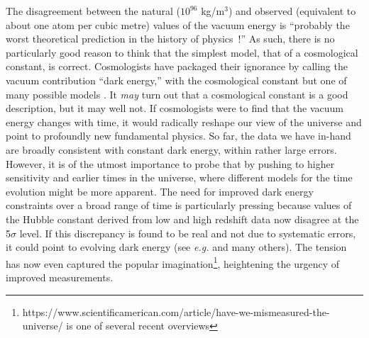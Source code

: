 \documentclass[letterpaper,11pt,preprint]{aastex}
\begin{document}
The disagreement between the natural ($10^{96}$ kg/m$^3$) and observed
(equivalent to about one atom per cubic metre) values of the vacuum
energy is ``probably the worst theoretical prediction in the history
of physics~\citep{Hobson06}!''  As such, there is no particularly good
reason to think that the simplest model, that of a cosmological
constant, is correct.  Cosmologists have packaged their ignorance by
calling the vacuum contribution ``dark energy,'' with the cosmological
constant but one of many possible models \citep{Ratra88,Steinhardt99}.
It {\textit{may}} turn out that a cosmological constant is a good
description, but it may well not.  If cosmologists were to find that
the vacuum energy changes with time, it would radically reshape our
view of the universe and point to profoundly new fundamental physics.
So far, the data we have in-hand are broadly consistent with constant
dark energy, within rather large errors.  However, it is of the utmost
importance to probe that by pushing to higher sensitivity and earlier
times in the universe, where different models for the time evolution
might be more apparent.  The need for improved dark energy constraints
over a broad range of time is particularly pressing because
values of the Hubble constant derived from low and high redshift data
now disagree at the 5$\sigma$ level.  If this discrepancy is found to
be real and not due to systematic errors, it could point to evolving
dark energy (see {\it{e.g.}} \citet{Freedman2017} and many others).
The tension has now even captured the popular
imagination\footnote{https://www.scientificamerican.com/article/have-we-mismeasured-the-universe/
  is one of several recent overviews}, heightening the urgency of
improved measurements.


\end{document}
